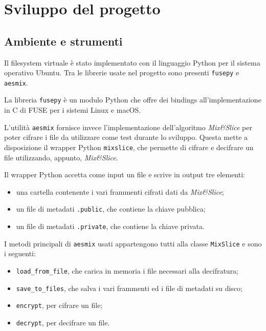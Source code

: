 \documentclass[a4paper,12pt,twoside,openright]{report}
\begin{document}

  \chapter{Sviluppo del progetto}
  \thispagestyle{fancy}

  \section{Ambiente e strumenti}

  Il filesystem virtuale è stato implementato con il linguaggio Python per il sistema operativo Ubuntu.
  Tra le librerie usate nel progetto sono presenti \texttt{fusepy} e \texttt{aesmix}.

  La libreria \texttt{fusepy} \cite{fusepygithub} è un modulo Python che offre dei bindings all'implementazione
  in C di FUSE per i sistemi Linux e macOS.

  L'utilità \texttt{aesmix} \cite{aesmixgithub} fornisce invece l'implementazione dell'algoritmo \textit{Mix\&Slice}
  per poter cifrare i file da utilizzare come test durante lo sviluppo.
  Questa mette a disposizione il wrapper Python \texttt{mixslice}, che permette di cifrare e decifrare un file utilizzando,
  appunto, \textit{Mix\&Slice}.

  Il wrapper Python accetta come input un file e scrive in output tre elementi:
  \begin{itemize}
    \item una cartella contenente i vari frammenti cifrati dati da \textit{Mix\&Slice};
    \item un file di metadati \texttt{.public}, che contiene la chiave pubblica;
    \item un file di metadati \texttt{.private}, che contiene la chiave privata.
  \end{itemize}

  I metodi principali di \texttt{aesmix} usati appartengono tutti alla classe \texttt{MixSlice} e sono i seguenti:
  \begin{itemize}
    \item \texttt{load\_from\_file}, che carica in memoria i file necessari alla decifratura;
    \item \texttt{save\_to\_files}, che salva i vari frammenti ed i file di metadati su disco;
    \item \texttt{encrypt}, per cifrare un file;
    \item \texttt{decrypt}, per decifrare un file.
  \end{itemize}
\end{document}
